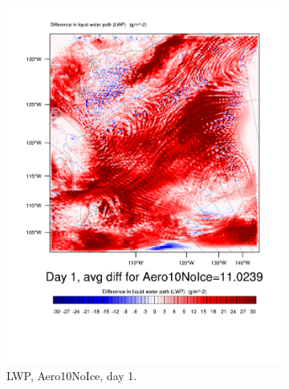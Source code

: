 \begin{figure}
\centering
	\begin{subfigure}{0.48\textwidth}
		\centering
		\includegraphics[width=\textwidth]{results/aero10ni/Diff_LWP_Day1Aero10NoIce.pdf}
		\caption{LWP, Aero10NoIce, day 1.}
		\label{subfig:LWPr4Day1}
	\end{subfigure}
	\quad
	\begin{subfigure}{0.48\textwidth}
		\centering

\end{subfigure}
\end{figure}
